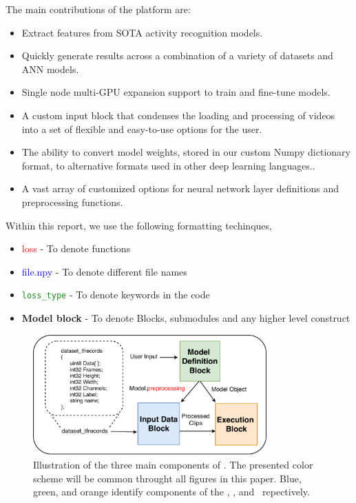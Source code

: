 \documentclass{llncs}
\begin{document}
The main contributions of the platform are:
\begin{itemize}
\item Extract features from SOTA activity recognition models.
\item Quickly generate results across a combination of a variety of datasets and ANN models.
\item Single node multi-GPU expansion support to train and fine-tune models.
\item A custom input block that condenses the loading and processing of videos into a set of flexible and easy-to-use options for the user.
\item The ability to convert model weights, stored in our custom Numpy dictionary format, to alternative formats used in other deep learning languages..
\item A vast array of customized options for neural network layer definitions and preprocessing functions.
\end{itemize}

Within this report, we use the following formatting techinques,
\begin{itemize}
\item \textcolor{red}{loss} - To denote functions
\item \textcolor{blue}{file.npy} - To denote different file names
\item \texttt{\textcolor{ForestGreen}{loss\_type}} - To denote keywords in the code
\item \textbf{Model block} - To denote Blocks, submodules and any higher level construct
\end{itemize}

\begin{figure}[t!]
\centering
\includegraphics[width=0.8\textwidth]{images/overview.pdf}
\caption{Illustration of the three main components of \acro.
The presented color scheme will be common throught all figures in this paper.
Blue, green, and orange identify components of the \data, \model, and \exec~repectively.}
\label{fig:overview}
\end{figure}
\end{document}
